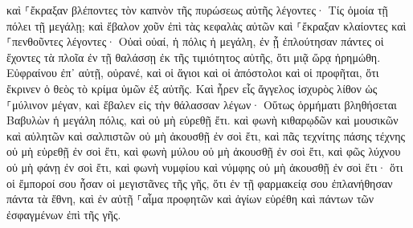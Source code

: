 \documentclass[twoside, 9pt]{extreport}
\begin{document}
καὶ ⸀ἔκραξαν βλέποντες τὸν καπνὸν τῆς πυρώσεως αὐτῆς λέγοντες· Τίς ὁμοία τῇ πόλει τῇ μεγάλῃ; 
καὶ ἔβαλον χοῦν ἐπὶ τὰς κεφαλὰς αὐτῶν καὶ ⸀ἔκραξαν κλαίοντες καὶ ⸀πενθοῦντες λέγοντες· Οὐαὶ οὐαί, ἡ πόλις ἡ μεγάλη, ἐν ᾗ ἐπλούτησαν πάντες οἱ ἔχοντες τὰ πλοῖα ἐν τῇ θαλάσσῃ ἐκ τῆς τιμιότητος αὐτῆς, ὅτι μιᾷ ὥρᾳ ἠρημώθη. 
Εὐφραίνου ἐπ᾽ αὐτῇ, οὐρανέ, καὶ οἱ ἅγιοι καὶ οἱ ἀπόστολοι καὶ οἱ προφῆται, ὅτι ἔκρινεν ὁ θεὸς τὸ κρίμα ὑμῶν ἐξ αὐτῆς. 
Καὶ ἦρεν εἷς ἄγγελος ἰσχυρὸς λίθον ὡς ⸀μύλινον μέγαν, καὶ ἔβαλεν εἰς τὴν θάλασσαν λέγων· Οὕτως ὁρμήματι βληθήσεται Βαβυλὼν ἡ μεγάλη πόλις, καὶ οὐ μὴ εὑρεθῇ ἔτι. 
καὶ φωνὴ κιθαρῳδῶν καὶ μουσικῶν καὶ αὐλητῶν καὶ σαλπιστῶν οὐ μὴ ἀκουσθῇ ἐν σοὶ ἔτι, καὶ πᾶς τεχνίτης πάσης τέχνης οὐ μὴ εὑρεθῇ ἐν σοὶ ἔτι, καὶ φωνὴ μύλου οὐ μὴ ἀκουσθῇ ἐν σοὶ ἔτι, 
καὶ φῶς λύχνου οὐ μὴ φάνῃ ἐν σοὶ ἔτι, καὶ φωνὴ νυμφίου καὶ νύμφης οὐ μὴ ἀκουσθῇ ἐν σοὶ ἔτι· ὅτι οἱ ἔμποροί σου ἦσαν οἱ μεγιστᾶνες τῆς γῆς, ὅτι ἐν τῇ φαρμακείᾳ σου ἐπλανήθησαν πάντα τὰ ἔθνη, 
καὶ ἐν αὐτῇ ⸀αἷμα προφητῶν καὶ ἁγίων εὑρέθη καὶ πάντων τῶν ἐσφαγμένων ἐπὶ τῆς γῆς. 
\end{document}
